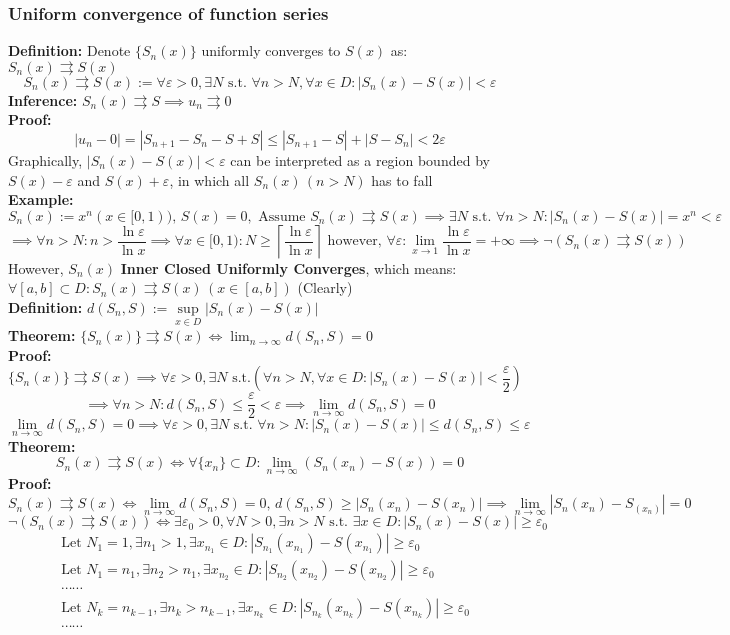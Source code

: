 \documentclass{article}
\newcommand{\0}{{\bf{0}}}
\begin{document}
\subsubsection{Uniform convergence of function series}
\textbf{Definition:} Denote $\{S_n(x)\}$ uniformly converges to $S(x)$ as: $S_n(x)\rightrightarrows S(x)$
$$S_n(x)\rightrightarrows S(x):=\forall\varepsilon>0,\exists N\mbox{ s.t. }\forall n>N,\forall x\in D:\left|S_n(x)-S(x)\right|<\varepsilon$$
\textbf{Inference:} $S_n(x)\rightrightarrows S\implies u_n\rightrightarrows0$\\
\textbf{Proof:}
$$|u_n-0|=|S_{n+1}-S_n-S+S|\le|S_{n+1}-S|+|S-S_n|<2\varepsilon$$
Graphically, $|S_n(x)-S(x)|<\varepsilon$ can be interpreted as a region bounded by $S(x)-\varepsilon$ and $S(x)+\varepsilon$, in which all $S_n(x)\,(n>N)$ has to fall\\
\textbf{Example:}
$$S_n(x):=x^n(x\in[0,1)),\,S(x)=0,\mbox{ Assume }S_n(x)\rightrightarrows S(x)\implies\exists N\mbox{ s.t. }\forall n>N:|S_n(x)-S(x)|=x^n<\varepsilon$$
$$\implies\forall n>N:n>\frac{\ln\varepsilon}{\ln x}\implies \forall x\in[0,1):N\geq\left\lceil\frac{\ln\varepsilon}{\ln x}\right\rceil\mbox{ however, }\forall\varepsilon:\lim_{x\to1}\frac{\ln\varepsilon}{\ln x}=+\infty\implies\neg(S_n(x)\rightrightarrows S(x))$$
However, $S_n(x)$ \textbf{Inner Closed Uniformly Converges}, which means: $\forall[a,b]\subset D:S_n(x)\rightrightarrows S(x)\,(x\in[a,b])$
\null\hfill(Clearly)\\
\textbf{Definition:} $d(S_n,S):=\sup\limits_{x\in D}|S_n(x)-S(x)|$\\
\textbf{Theorem:} $\{S_n(x)\}\rightrightarrows S(x)\iff\lim_{n\to\infty}d(S_n,S)=0$\\
\textbf{Proof:}
$$\{S_n(x)\}\rightrightarrows S(x)\implies\forall\varepsilon>0,\exists N\mbox{ s.t.}\left(\forall n>N,\forall x\in D:\left|S_n(x)-S(x)\right|<\frac{\varepsilon}{2}\right)$$
$$\implies\forall n>N:d(S_n,S)\le\frac{\varepsilon}{2}<\varepsilon\implies\lim_{n\to\infty}d(S_n,S)=0$$
$$\lim_{n\to\infty}d(S_n,S)=0\implies\forall\varepsilon>0,\exists N\mbox{ s.t. }\forall n>N:|S_n(x)-S(x)|\le d(S_n,S)\le\varepsilon$$
\textbf{Theorem:}
$$S_n(x)\rightrightarrows S(x)\iff\forall\{x_n\}\subset D:\lim_{n\to\infty}(S_n(x_n)-S(x))=0$$
\textbf{Proof:}
$$S_n(x)\rightrightarrows S(x)\iff \lim_{n\to\infty}d(S_n,S)=0,\,d(S_n,S)\geq|S_n(x_n)-S(x_n)|\implies\lim_{n\to\infty}|S_n(x_n)-S_(x_n)|=0$$
$$\neg(S_n(x)\rightrightarrows S(x))\iff\exists\varepsilon_0>0,\forall N>0,\exists n>N\mbox{ s.t. }\exists x\in D:|S_n(x)-S(x)|\geq\varepsilon_0$$
\begin{equation}
\begin{split}
    &\mbox{Let }N_1=1,\exists n_1>1,\exists x_{n_1}\in D:|S_{n_1}(x_{n_1})-S(x_{n_1})|\geq\varepsilon_0\\
    &\mbox{Let }N_1=n_1,\exists n_2>n_1,\exists x_{n_2}\in D:|S_{n_2}(x_{n_2})-S(x_{n_2})|\geq\varepsilon_0\\
    &\cdots\cdots\\
    &\mbox{Let }N_k=n_{k-1},\exists n_k>n_{k-1},\exists x_{n_k}\in D:|S_{n_k}(x_{n_k})-S(x_{n_k})|\geq\varepsilon_0\\
    &\cdots\cdots
\end{split}
\end{equation}
\end{document}
